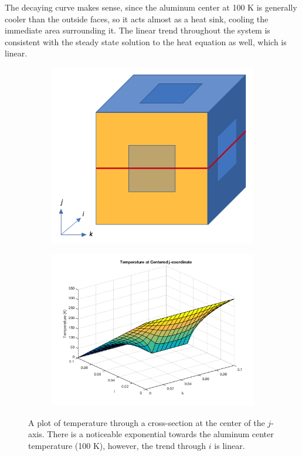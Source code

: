 \documentclass[12pt]{article}
\begin{document}
The decaying curve makes sense, since the aluminum center at 100 K is generally cooler than the outside faces, so it acts almost as a heat sink, cooling the immediate area surrounding it.  The linear trend throughout the system is consistent with the steady state solution to the heat equation as well, which is linear. \cite{heateq}

\begin{figure}[h!]
\begin{center}
\begin{subfigure}{0.3\textwidth}
\includegraphics[width=\linewidth]{../pics/centeredjpic.png}
\caption{\label{centeredjpic}}
\end{subfigure}
\begin{subfigure}{0.6\textwidth}
\includegraphics[width=\linewidth]{../pics/centeredj.png}
\caption{\label{centeredj}}
\end{subfigure}
\caption{A plot of temperature through a cross-section at the center of the $j$-axis.  There is a noticeable exponential towards the aluminum center temperature (100 K), however, the trend through $i$ is linear.}
\end{center}
\end{figure}
\end{document}
